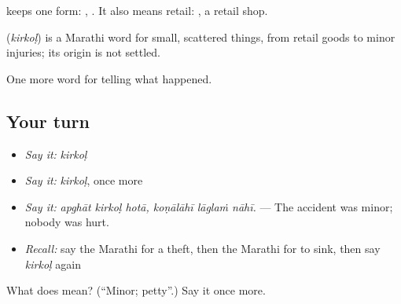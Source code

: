  keeps one form:  ,  . It also means retail:  , a retail shop.

\begin{cousinweb}
\textbf{} (\emph{kirkoḷ}) is a Marathi word for small, scattered things, from retail goods to minor injuries; its origin is not settled.
\end{cousinweb}

\begin{grammarlens}[title={What you've built}]
One more word for telling what happened.
\end{grammarlens}

\subsection*{Your turn}
\begin{itemize}
\raggedright
  \item \emph{Say it:} \emph{kirkoḷ}
  \item \emph{Say it:} \emph{kirkoḷ}, once more
  \item \emph{Say it:} \emph{apghāt kirkoḷ hotā, koṇālāhī lāglaṁ nāhī.} — The accident was minor; nobody was hurt.
  \item \emph{Recall:} say the Marathi for a theft, then the Marathi for to sink, then say \emph{kirkoḷ} again
\end{itemize}

\begin{tcolorbox}[breakable,colback=teal!4,colframe=teal!35!black,title={Before you move on}]
What does  mean? (\textquotedblleft{}Minor; petty\textquotedblright{}.) Say it once more.
\end{tcolorbox}
